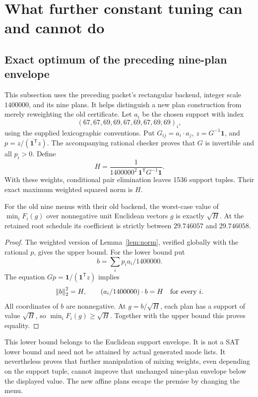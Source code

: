 \section{What further constant tuning can and cannot do}\label{sec:envelope}

\subsection{Exact optimum of the preceding nine-plan envelope}

This subsection uses the preceding packet's rectangular backend,
integer scale \(1400000\), and its nine plans. It helps distinguish a new
plan construction from merely reweighting the old certificate.
Let \(a_i\) be the chosen support with index
\[
 (67,67,69,69,67,69,67,69,69)_i,
\]
using the supplied lexicographic conventions. Put
\(G_{ij}=a_i\cdot a_j\), \(z=G^{-1}\mathbf1\), and
\(p=z/(\mathbf1^{\mathsf T}z)\).
The accompanying rational checker proves that \(G\) is invertible and all
\(p_i>0\). Define
\[
 H=\frac{1}{1400000^2\,\mathbf1^{\mathsf T}G^{-1}\mathbf1}.
\]
With these weights, conditional pair elimination leaves 1536 support
tuples. Their exact maximum weighted squared norm is \(H\).

\begin{proposition}\label{prop:nineopt}
For the old nine menus with their old backend, the worst-case value of
\(\min_i F_i(g)\) over nonnegative unit Euclidean vectors \(g\) is exactly
\(\sqrt H\). At the retained root schedule its coefficient is strictly
between \(29.746057\) and \(29.746058\).
\end{proposition}
\begin{proof}
The weighted version of Lemma~\ref{lem:norm}, verified globally with
the rational \(p\), gives the upper bound.
For the lower bound put
\[
 b=\sum_i p_i a_i/1400000.
\]
The equation \(Gp=\mathbf1/(\mathbf1^{\mathsf T}z)\) implies
\[
 \left\lVert b\right\rVert_2^2=H,\qquad (a_i/1400000)\cdot b=H
 \quad\hbox{for every }i.
\]
All coordinates of \(b\) are nonnegative. At \(g=b/\sqrt H\),
each plan has a support of value \(\sqrt H\), so
\(\min_iF_i(g)\ge\sqrt H\).
Together with the upper bound this proves equality.
\end{proof}

This lower bound belongs to the Euclidean support envelope. It is not a
SAT lower bound and need not be attained by actual generated mode lists.
It nevertheless proves that further manipulation of mixing weights,
even depending on the support tuple, cannot improve that unchanged
nine-plan envelope below the displayed value. The new affine plans
escape the premise by changing the menu.

